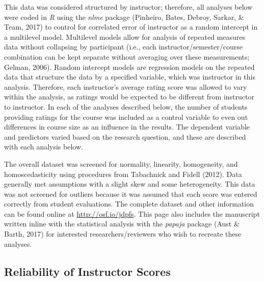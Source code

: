 \documentclass[,man]{apa6}
\theoremstyle{definition}
\theoremstyle{definition}
\theoremstyle{definition}
\theoremstyle{remark}
\begin{document}
This data was considered structured by instructor; therefore, all
analyses below were coded in \emph{R} using the \emph{nlme} package
(Pinheiro, Bates, Debroy, Sarkar, \& Team, 2017) to control for
correlated error of instructor as a random intercept in a multilevel
model. Multilevel models allow for analysis of repeated measures data
without collapsing by participant (i.e., each instructor/semester/course
combination can be kept separate without averaging over these
measurements; Gelman, 2006). Random intercept models are regression
models on the repeated data that structure the data by a specified
variable, which was instructor in this analysis. Therefore, each
instructor's average rating score was allowed to vary within the
analysis, as ratings would be expected to be different from instructor
to instructor. In each of the analyses described below, the number of
students providing ratings for the course was included as a control
variable to even out differences in course size as an influence in the
results. The dependent variable and predictors varied based on the
research question, and these are described with each analysis below.

The overall dataset was screened for normality, linearity, homogeneity,
and homoscedasticity using procedures from Tabachnick and Fidell (2012).
Data generally met assumptions with a slight skew and some
heterogeneity. This data was not screened for outliers because it was
assumed that each score was entered correctly from student evaluations.
The complete dataset and other information can be found online at
\url{http://osf.io/jdpfs}. This page also includes the manuscript
written inline with the statistical analysis with the \emph{papaja}
package (Aust \& Barth, 2017) for interested researchers/reviewers who
wish to recreate these analyses.

\hypertarget{reliability-of-instructor-scores}{%
\subsection{Reliability of Instructor
Scores}\label{reliability-of-instructor-scores}}
\end{document}
